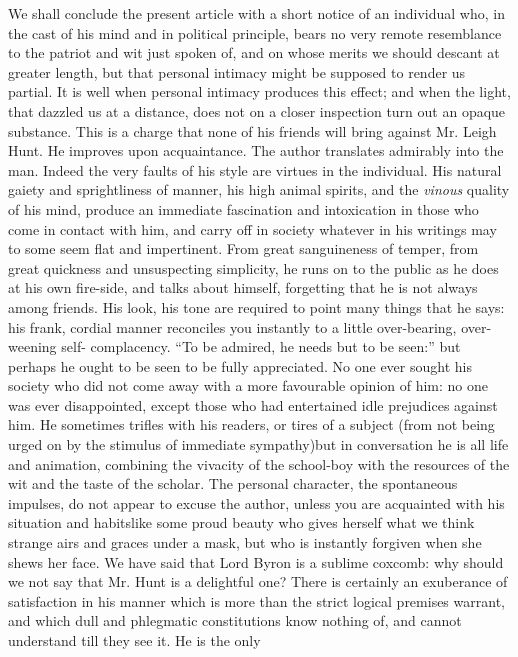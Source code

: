 We shall conclude the present article with a short notice of an
individual who, in the cast of his mind and in political
principle, bears no very remote resemblance to the patriot and wit
just spoken of, and on whose merits we should descant at greater
length, but that personal intimacy might be supposed to render us
partial. It is well when personal intimacy produces this effect;
and when the light, that dazzled us at a distance, does not on a
closer inspection turn out an opaque substance. This is a charge
that none of his friends will bring against Mr. Leigh Hunt. He
improves upon acquaintance. The author translates admirably into
the man. Indeed the very faults of his style are virtues in the
individual. His natural gaiety and sprightliness of manner, his
high animal spirits, and the \emph{vinous} quality of his mind,
produce an immediate fascination and intoxication in those who
come in contact with him, and carry off in society whatever in his
writings may to some seem flat and impertinent. From great
sanguineness of temper, from great quickness and unsuspecting
simplicity, he runs on to the public as he does at his own
fire-side, and talks about himself, forgetting that he is not
always among friends. His look, his tone are required to point
many things that he says: his frank, cordial manner reconciles you
instantly to a little over-bearing, over-weening self-
complacency. ``To be admired, he needs but to be seen:'' but
perhaps he ought to be seen to be fully appreciated. No one ever
sought his society who did not come away with a more favourable
opinion of him: no one was ever disappointed, except those who had
entertained idle prejudices against him. He sometimes trifles with
his readers, or tires of a subject (from not being urged on by the
stimulus of immediate sympathy)\textemdash but in conversation he
is all life and animation, combining the vivacity of the
school-boy with the resources of the wit and the taste of the
scholar. The personal character, the spontaneous impulses, do not
appear to excuse the author, unless you are acquainted with his
situation and habits\textemdash like some proud beauty who gives
herself what we think strange airs and graces under a mask, but
who is instantly forgiven when she shews her face. We have said
that Lord Byron is a sublime coxcomb: why should we not say that
Mr. Hunt is a delightful one? There is certainly an exuberance of
satisfaction in his manner which is more than the strict logical
premises warrant, and which dull and phlegmatic constitutions know
nothing of, and cannot understand till they see it. He is the only
